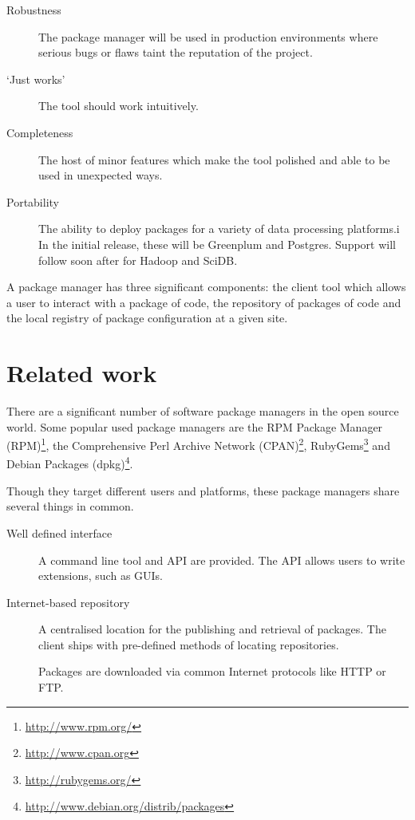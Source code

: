 \documentclass[11pt]{article}
\begin{document}
{\begin{description}
		\item[Robustness] The package manager will be used in production
		environments where serious bugs or flaws taint the reputation of the
		project.

		\item[`Just works'] The tool should work intuitively.

		\item[Completeness] The host of minor features which make the tool
		polished and able to be used in unexpected ways.

		\item[Portability] The ability to deploy packages for a variety of
		data processing platforms.i In the initial release, these will be
		Greenplum and Postgres. Support will follow soon after for Hadoop and
		SciDB.

	\end{description}

	A package manager has three significant components: the client tool which
	allows a user to interact with a package of code, the repository of packages
	of code and the local registry of package configuration at a given site.

\section{Related work}

There are a significant number of software package managers in the open source
world. Some popular used package managers are the
RPM Package Manager (RPM)\footnote{\url{http://www.rpm.org/}}, 
the Comprehensive Perl Archive Network
(CPAN)\footnote{\url{http://www.cpan.org}},
RubyGems\footnote{\url{http://rubygems.org/}} and
Debian Packages (dpkg)\footnote{\url{http://www.debian.org/distrib/packages}}.

Though they target different users and platforms, these package managers share
several things in common.

\begin{description}
	\item[Well defined interface] A command line tool and API are provided.
	The API allows users to write extensions, such as GUIs.

	\item[Internet-based repository] A centralised location for the publishing
	and retrieval of packages. The client ships with pre-defined methods of
	locating repositories.

	Packages are downloaded via common Internet protocols like HTTP or FTP.


\end{description}}
\end{document}
